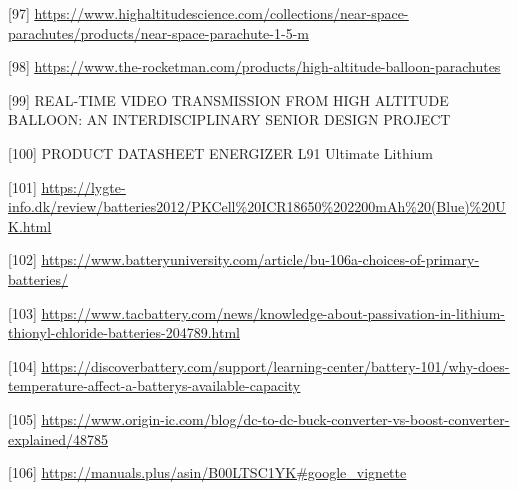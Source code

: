 \documentclass[12pt,a4paper]{article}
\begin{document}
{[}97{]} \href{https://www.highaltitudescience.com/collections/near-space-parachutes/products/near-space-parachute-1-5-m}{\ul{https://www.highaltitudescience.com/collections/near-space-parachutes/products/near-space-parachute-1-5-m}}

{[}98{]} \href{https://www.the-rocketman.com/products/high-altitude-balloon-parachutes?variant=42200331944030}{\ul{https://www.the-rocketman.com/products/high-altitude-balloon-parachutes}}

{[}99{]} REAL-TIME VIDEO TRANSMISSION FROM HIGH ALTITUDE BALLOON: AN INTERDISCIPLINARY SENIOR DESIGN PROJECT

{[}100{]} PRODUCT DATASHEET ENERGIZER L91 Ultimate Lithium

{[}101{]} \href{https://lygte-info.dk/review/batteries2012/PKCell\%20ICR18650\%202200mAh\%20(Blue)\%20UK.html}{\ul{https://lygte-info.dk/review/batteries2012/PKCell\%20ICR18650\%202200mAh\%20(Blue)\%20UK.html}}

{[}102{]} \href{https://www.batteryuniversity.com/article/bu-106a-choices-of-primary-batteries/}{\ul{https://www.batteryuniversity.com/article/bu-106a-choices-of-primary-batteries/}}

{[}103{]} \href{https://www.tacbattery.com/news/knowledge-about-passivation-in-lithium-thionyl-chloride-batteries-204789.html}{\ul{https://www.tacbattery.com/news/knowledge-about-passivation-in-lithium-thionyl-chloride-batteries-204789.html}}

{[}104{]} \href{https://discoverbattery.com/support/learning-center/battery-101/why-does-temperature-affect-a-batterys-available-capacity}{\ul{https://discoverbattery.com/support/learning-center/battery-101/why-does-temperature-affect-a-batterys-available-capacity}}

{[}105{]} \href{https://www.origin-ic.com/blog/dc-to-dc-buck-converter-vs-boost-converter-explained/48785}{\ul{https://www.origin-ic.com/blog/dc-to-dc-buck-converter-vs-boost-converter-explained/48785}}

{[}106{]} \href{https://manuals.plus/asin/B00LTSC1YK\#google_vignette}{\ul{https://manuals.plus/asin/B00LTSC1YK\#google\_vignette}}
\end{document}
